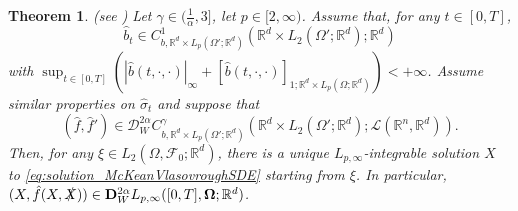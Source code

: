 \documentclass[10pt, a4paper]{article} %
\newcommand{\R}{\mathbb{R}}
\theoremstyle{definition}
\theoremstyle{plain}
\newtheorem{thm}[defn]{Theorem}
\begin{document}
\begin{thm} \label{thm:wellposedness_McKeanVlasovroughSDEs}
    (see \cite[Theorem 3.10]{FHL25})
    Let $\gamma \in (\frac{1}{\alpha},3]$, let $p \in [2,\infty)$. 
    Assume that, for any $t \in [0,T]$,  $$\hat b_t \in C^1_{b, \R^d \times L_p(\Omega';\R^d)} (\R^d \times L_2(\Omega';\R^d) ; \R^d)$$ with $\sup_{t \in [0,T]} (|\hat b(t,\cdot , \cdot)|_{\infty} + [\hat b(t,\cdot , \cdot)]_{1;\R^d \times L_p(\Omega;\R^d)}) < +\infty$.  
    Assume similar properties on $\hat \sigma_t$ and suppose that
    \begin{equation*}
        (\hat{f},\hat{f}') \in \mathscr{D}_W^{2\alpha} C_{b, \R^d \times L_p(\Omega';\R^d)}^\gamma(\R^d \times L_2(\Omega';\R^d); \mathscr{L}(\R^n,\R^d)) .
    \end{equation*}  
    Then, for any $\xi \in L_2(\Omega, \mathcal{F}_0;\R^d)$, there is a unique $L_{p,\infty}$-integrable solution $X$ to \eqref{eq:solution_McKeanVlasovroughSDE} starting from $\xi$. In particular, $(X,\hat{f}(X,\slashed{X})) \in \mathbf{D}_W^{2\alpha}L_{p,\infty}([0,T], \mathbf{\Omega}; \R^d)$.
    
\end{thm}

\end{document}
